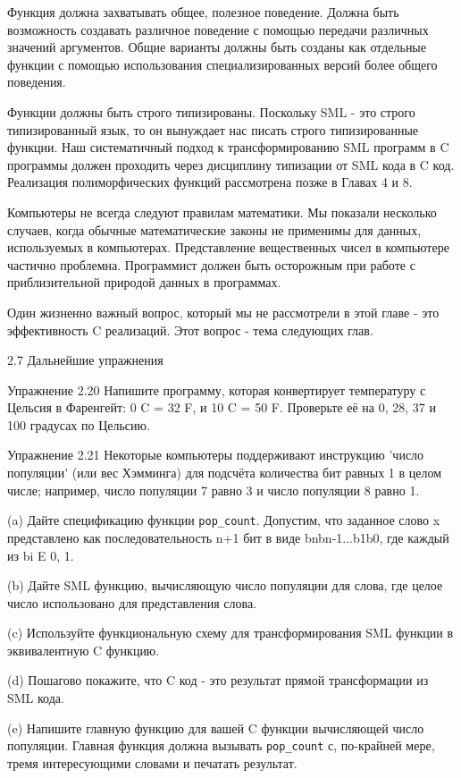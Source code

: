 Функция должна захватывать общее, полезное поведение. Должна быть возможность создавать различное поведение с помощью передачи различных значений аргументов. Общие варианты должны быть созданы как отдельные функции с помощью использования специализированных версий более общего поведения.

Функции должны быть строго типизированы. Поскольку SML - это строго типизированный язык, то он вынуждает нас писать строго типизированные функции. Наш систематичный подход к трансформированию SML программ в C программы должен проходить через дисциплину типизации от SML кода в C код. Реализация полиморфических функций рассмотрена позже в Главах 4 и 8.

Компьютеры не всегда следуют правилам математики. Мы показали несколько случаев, когда обычные математические законы не применимы для данных, используемых в компьютерах. Представление вещественных чисел в компьютере частично проблемна. Программист должен быть осторожным при работе с приблизительной природой данных в программах.

Один жизненно важный вопрос, который мы не рассмотрели в этой главе - это эффективность C реализаций. Этот вопрос - тема следующих глав.

2.7 Дальнейшие упражнения

Упражнение 2.20 Напишите программу, которая конвертирует температуру с Цельсия в Фаренгейт: 0 C = 32 F, и 10 C = 50 F. Проверьте её на 0, 28, 37 и 100 градусах по Цельсию.

Упражнение 2.21 Некоторые компьютеры поддерживают инструкцию 'число популяции' (или вес Хэмминга) для подсчёта количества бит равных 1 в целом числе; например, число популяции 7 равно 3 и число популяции 8 равно 1.

(a) Дайте спецификацию функции \lstinline|pop_count|. Допустим, что заданное слово x представлено как последовательность n+1 бит в виде bnbn-1...b1b0, где каждый из bi E {0, 1}.

(b) Дайте SML функцию, вычисляющую число популяции для слова, где целое число использовано для представления слова.

(c) Используйте функциональную схему для трансформирования SML функции в эквивалентную C функцию.

(d) Пошагово покажите, что C код - это результат прямой трансформации из SML кода.

(e) Напишите главную функцию для вашей C функции вычисляющей число популяции. Главная функция должна вызывать \lstinline|pop_count| с, по-крайней мере, тремя интересующими словами и печатать результат.

